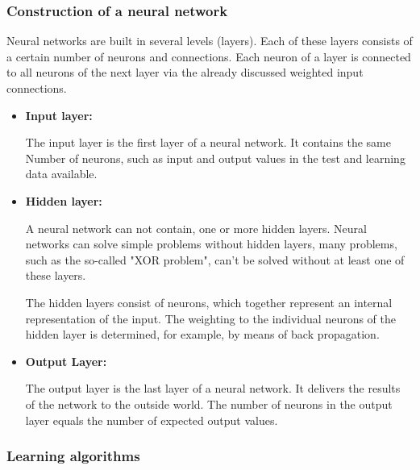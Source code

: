 \subsubsection{Construction of a neural network}



Neural networks are built in several levels (layers). Each
of these layers consists of a certain number of neurons and
connections. Each neuron of a layer is connected to all
neurons of the next layer via the already discussed
weighted input connections.

\begin{itemize}

  \item \textbf{Input layer:}

        The input layer is the first layer of a neural
        network. It contains the same Number of neurons,
        such as input and output values in the test and
        learning data available.

  \item \textbf{Hidden layer:}

        A neural network can not contain, one or more
        hidden layers. Neural networks can solve simple
        problems without hidden layers, many problems, such
        as the so-called "XOR problem", can't be solved
        without at least one of these layers.\cite{nne_beck}

        The hidden layers consist of neurons, which
        together represent an internal representation of
        the input. The weighting to the individual neurons
        of the hidden layer is determined, for example, by
        means of back propagation.

  \item \textbf{Output Layer:}

        The output layer is the last layer of a neural
        network. It delivers the results of the network to
        the outside world. The number of neurons in the
        output layer equals the number of expected output
        values.


\end{itemize}

\subsubsection{Learning algorithms}

